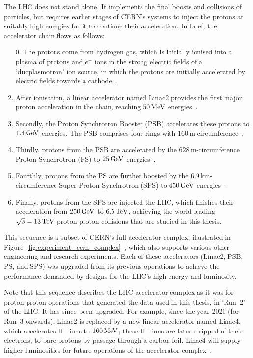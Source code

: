 The LHC does not stand alone.
It implements the final boosts and collisions of particles, but requires
earlier stages of CERN's systems to inject the protons at suitably high
energies for it to continue their acceleration.
In brief, the accelerator chain flows as follows:
\begin{enumerate}
\item[0.] The protons come from hydrogen gas, which is initially ionised into a
plasma of protons and $e^-$ ions in the strong electric fields of a
`duoplasmotron' ion source, in which the protons are initially accelerated by
electric fields towards a cathode~\cite{lhc50years2013}.
\item After ionisation, a linear accelerator named Linac2 provides the first
major proton acceleration in the chain, reaching $50\,\eV[M]$
energies~\cite{lhc50years2013}.
\item Secondly, the Proton Synchrotron Booster (PSB) accelerates these protons
to $1.4\,\eV[G]$ energies.
The PSB comprises four rings with $160\,\mathrm{m}$
circumference~\cite{linac4protonsource,lhc50years2013}.
\item Thirdly, protons from the PSB are accelerated by the
$628\,\mathrm{m}$-circumference
Proton Synchrotron (PS) to $25\,\eV[G]$ energies~\cite{lhc2000psInjector}.
\item Fourthly, protons from the PS are further boosted by the
$6.9\,\mathrm{km}$-circumference
Super Proton Synchrotron (SPS) to $450\,\eV[G]$
energies~\cite{synchroton:445034}.
\item Finally, protons from the SPS are injected the LHC, which finishes
their acceleration from $250\,\eV[G]$ to $6.5\,\eV[T]$, achieving the
world-leading $\sqrt{s} = 13\,\eV[T]$ proton-proton collisions that are studied
in this thesis.
\end{enumerate}
This sequence is a subset of CERN's full accelerator complex,
illustrated in Figure~\ref{fig:experiment_cern_complex}~\cite{Haffner:1621894},
which also supports various other engineering and research experiments.
Each of these accelerators (Linac2, PSB, PS, and SPS) was upgraded from its
previous operations to achieve the performance demanded by designs for the
LHC's high energy and luminosity.

Note that this sequence describes the LHC accelerator complex as it was for
proton-proton operations that generated the data used in this thesis,
in `Run~2' of the LHC.
It has since been upgraded.
For example, since the year 2020 (for Run~3 onwards), Linac2 is replaced by a
new linear accelerator named Linac4,
which accelerates $\mathrm{H}^-$ ions to $160\,\eV[M]$;
these $\mathrm{H}^-$ ions are later stripped of their electrons,
to bare protons by passage through a carbon foil.
Linac4 will supply higher luminosities for future operations of the accelerator
complex~\cite{linac4techreport,linac4protonsource}.

